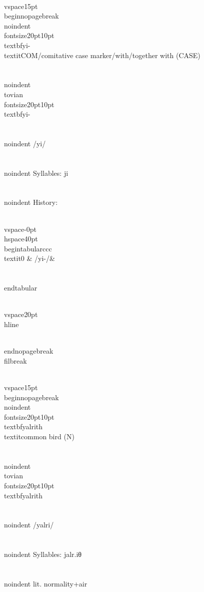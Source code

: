 \\vspace{15pt}
\\begin{nopagebreak}
\\noindent{\\fontsize{20pt}{10pt}\\textbf{yi-} } \\textit{COM/comitative case marker/with/together with} (CASE)\\\\
\\noindent {\\tovian \\fontsize{20pt}{10pt} \\textbf{yi-} }\\\\
\\noindent /y{\textprimstress}i/\\\\
\\noindent Syllables: ji\\\\


\\noindent History:

\\vspace{-0pt}
\\hspace{40pt}
\\begin{tabular}{ccc}
\\textit{0} & /yi-/& \\\\
\\end{tabular}

\\vspace{20pt}\\hline

\\end{nopagebreak}
\\filbreak



\\vspace{15pt}
\\begin{nopagebreak}
\\noindent{\\fontsize{20pt}{10pt}\\textbf{yalrith} } \\textit{common bird} (N)\\\\
\\noindent {\\tovian \\fontsize{20pt}{10pt} \\textbf{yalrith} }\\\\
\\noindent /y{\textprimstress}alri{\texttheta}/\\\\
\\noindent Syllables: jalr.iθ\\\\
\\noindent lit. normality+air\\\\



